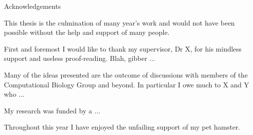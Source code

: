 \documentclass[../thesis-main.tex]{subfiles}
\begin{document}
 \vspace*{20mm}
 {
  \Large\bf
  \begin{center}
   Acknowledgements
  \end{center}
 }
 
 This thesis is the culmination of many year's work and would not have
 been possible without the help and support of many
 people. 
 
 First and foremost I would like to thank my supervisor,
 Dr X, for his mindless support and useless proof-reading.
 Blah, gibber ...
 
 Many of the ideas presented are the outcome of discussions
 with members of the Computational Biology Group and beyond. In particular I owe
 much to X and Y who ...
 
 My research was funded by a ...
 
 Throughout this year I have enjoyed the unfailing support of
 my pet hamster.
\end{document}
